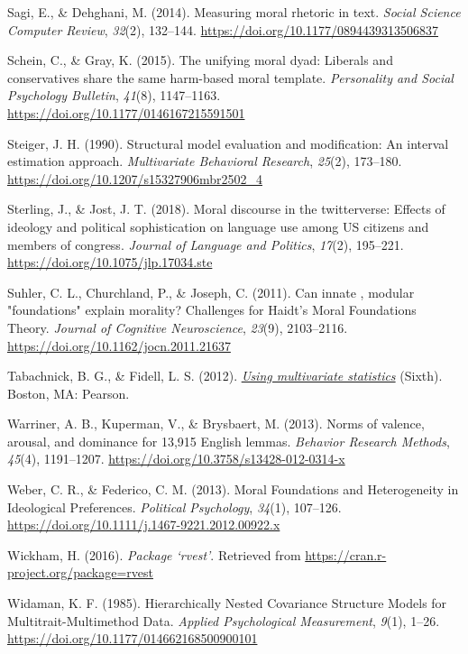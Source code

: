 \documentclass[
  man,floatsintext]{apa6}
\newlength{\cslhangindent}
\newenvironment{CSLReferences}[2] %
 {\begin{list}{}{%
  \setlength{\itemindent}{0pt}
  \setlength{\leftmargin}{0pt}
  \setlength{\parsep}{0pt}
  \ifodd #1
   \setlength{\leftmargin}{\cslhangindent}
   \setlength{\itemindent}{-1\cslhangindent}
  \fi
  \setlength{\itemsep}{#2\baselineskip}}}
 {\end{list}}
\begin{document}
\begin{CSLReferences}{1}{0}
Sagi, E., \& Dehghani, M. (2014). Measuring moral rhetoric in text. \emph{Social Science Computer Review}, \emph{32}(2), 132--144. \url{https://doi.org/10.1177/0894439313506837}

Schein, C., \& Gray, K. (2015). The unifying moral dyad: Liberals and conservatives share the same harm-based moral template. \emph{Personality and Social Psychology Bulletin}, \emph{41}(8), 1147--1163. \url{https://doi.org/10.1177/0146167215591501}

Steiger, J. H. (1990). Structural model evaluation and modification: An interval estimation approach. \emph{Multivariate Behavioral Research}, \emph{25}(2), 173--180. \url{https://doi.org/10.1207/s15327906mbr2502_4}

Sterling, J., \& Jost, J. T. (2018). Moral discourse in the twitterverse: Effects of ideology and political sophistication on language use among US citizens and members of congress. \emph{Journal of Language and Politics}, \emph{17}(2), 195--221. \url{https://doi.org/10.1075/jlp.17034.ste}

Suhler, C. L., Churchland, P., \& Joseph, C. (2011). Can innate , modular "foundations" explain morality? Challenges for {H}aidt's {M}oral {F}oundations {T}heory. \emph{Journal of Cognitive Neuroscience}, \emph{23}(9), 2103--2116. \url{https://doi.org/10.1162/jocn.2011.21637}

Tabachnick, B. G., \& Fidell, L. S. (2012). \emph{\href{https://www.ncbi.nlm.nih.gov/pubmed/1577}{{Using multivariate statistics}}} (Sixth). Boston, MA: Pearson.

Warriner, A. B., Kuperman, V., \& Brysbaert, M. (2013). {Norms of valence, arousal, and dominance for 13,915 English lemmas}. \emph{Behavior Research Methods}, \emph{45}(4), 1191--1207. \url{https://doi.org/10.3758/s13428-012-0314-x}

Weber, C. R., \& Federico, C. M. (2013). {Moral Foundations and Heterogeneity in Ideological Preferences}. \emph{Political Psychology}, \emph{34}(1), 107--126. \url{https://doi.org/10.1111/j.1467-9221.2012.00922.x}

Wickham, H. (2016). \emph{{Package `rvest'}}. Retrieved from \url{https://cran.r-project.org/package=rvest}

Widaman, K. F. (1985). Hierarchically Nested Covariance Structure Models for Multitrait-Multimethod Data. \emph{Applied Psychological Measurement}, \emph{9}(1), 1--26. \url{https://doi.org/10.1177/014662168500900101}

\end{CSLReferences}
\end{document}
